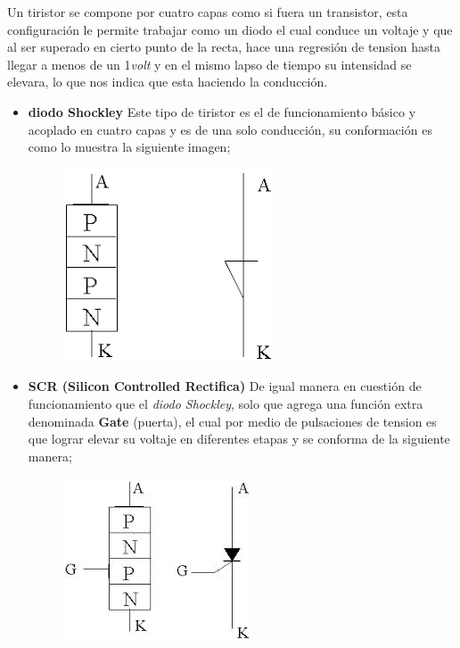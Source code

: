 \documentclass[11pt,a4paper]{article}
\begin{document}
Un tiristor se compone por cuatro capas como si fuera un transistor, esta configuración le permite trabajar como un diodo el cual conduce un voltaje y que al ser superado en cierto punto de la recta, hace una regresión de tension hasta llegar a menos de un 1\emph{volt} y en el mismo lapso de tiempo su intensidad se elevara, lo que nos indica que esta haciendo la conducción.

\begin{itemize}

\item \textbf{diodo Shockley} 
Este tipo de tiristor es el de funcionamiento básico y acoplado en cuatro capas y es de una solo conducción, su conformación es como lo muestra la siguiente imagen;


\begin{figure}[hbtp]
\centering
\includegraphics[scale=0.7]{3.png}
\end{figure}



\item \textbf{SCR (Silicon Controlled Rectifica)}
De igual manera en cuestión de funcionamiento que el \emph{diodo Shockley}, solo que agrega una función extra denominada \textbf{Gate} (puerta), el cual por medio de pulsaciones de tension es que lograr elevar su voltaje en diferentes etapas y se conforma de la siguiente manera;

\begin{figure}[hbtp]
\centering
\includegraphics[scale=0.7]{2.png} 
\end{figure}


\end{itemize}
\end{document}
